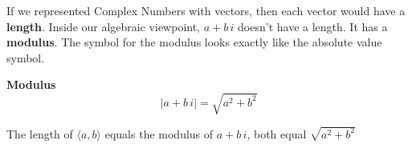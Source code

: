 \documentclass{ximera}
\begin{document}
If we represented Complex Numbers with vectors, then each vector would have a \textbf{length}.  Inside our algebraic viewpoint, $a + b \, i$ doesn't have a length. It has a \textbf{modulus}.  The symbol for the modulus looks exactly like the absolute value symbol.

\begin{definition} \textbf{\textcolor{green!50!black}{Modulus}} \\
\[      |a + b \, i|    = \sqrt{a^2 + b^2}   \]
\end{definition}

The length of $\langle a, b \rangle$ equals the modulus of $a + b \, i$, both equal $\sqrt{a^2 + b^2}$
\end{document}
